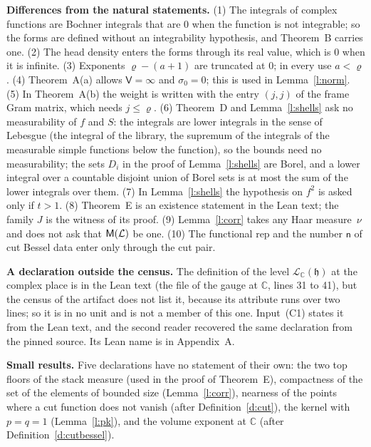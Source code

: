 \documentclass[11pt,a4paper]{article}
\makeatletter
\newcommand{\lean}[1]{\csname LN@#1\endcsname}
\newcommand{\leantag}{{\sffamily\bfseries\fontsize{6.3}{8}\selectfont\color{leancol}\addfontfeatures{LetterSpace=7}LEAN}}
\newcommand{\leanline}[1]{\par\nopagebreak\vspace{-2.5pt}{\fontsize{8.9}{12.4}\selectfont\color{inksoft}\raggedright
  \noindent\llap{\leantag\hspace{9pt}}#1\par}\vspace{1pt}}
\theoremstyle{plainx}
\theoremstyle{uprightx}
\newcommand{\cL}{\mathcal{L}}
\newcommand{\CC}{\mathbb{C}}
\newcommand{\cLC}[1]{\mathcal{L}_{\CC}(#1)}
\newcommand{\Inp}[1]{\textup{(#1)}}
\makeatother
\begin{document}
\textbf{Differences from the natural statements.} (1) The integrals of complex functions are Bochner integrals that
are $0$ when the function is not integrable; so the forms are defined without an integrability hypothesis, and
Theorem~B carries one. (2) The head density enters the forms through its real value, which is $0$ when it is
infinite. (3) Exponents $\varrho-(a+1)$ are truncated at $0$; in every use $a<\varrho$. (4) Theorem~A(a) allows
$\mathsf{V}=\infty$ and $\sigma_0=0$; this is used in Lemma~\ref{l:norm}. (5) In Theorem~A(b) the weight is written with the
entry $(j,j)$ of the frame Gram matrix, which needs $j\le\varrho$. (6) Theorem~D and Lemma~\ref{l:shells} ask no
measurability of $f$ and $S$: the integrals are lower integrals in the sense of Lebesgue (the integral of the
library, the supremum of the integrals of the measurable simple functions below the function), so the bounds need no
measurability; the sets $D_i$ in the proof of Lemma~\ref{l:shells} are Borel, and a lower integral over a countable
disjoint union of Borel sets is at most the sum of the lower integrals over them. (7) In
Lemma~\ref{l:shells} the hypothesis on $f^2$ is asked only if $t>1$. (8) Theorem~E is an existence statement in
the Lean text; the family $J$ is the witness of its proof. (9) Lemma~\ref{l:corr} takes any Haar measure~$\nu$ and
does not ask that $\groupMeasure{\cL}$ be one. (10) The functional $\mathrm{rep}$ and the number $\mathsf{n}$ of cut
Bessel data enter only through the cut pair.

\textbf{A declaration outside the census.} The definition of the level $\cLC{\mathfrak{h}}$ at the complex place
is in the Lean text (the file of the gauge at $\CC$, lines 31 to 41), but the census of the artifact does not list
it, because its attribute runs over two lines; so it is in no unit and is not a member of this one. Input~\Inp{C1}
states it from the Lean text, and the second reader recovered the same declaration from the pinned source. Its Lean
name is in Appendix~A.

\textbf{Small results.} Five declarations have no statement of their own: the two top floors of the stack measure
(used in the proof of Theorem~E), compactness of the set of the elements of bounded size (Lemma~\ref{l:corr}), nearness
of the points where a cut function does not vanish (after Definition~\ref{d:cut}), the kernel with $p=q=1$
(Lemma~\ref{l:pk}), and the volume exponent at $\CC$ (after Definition~\ref{d:cutbessel}).
\leanline{\lean{stackMeasuretop}}
\end{document}
